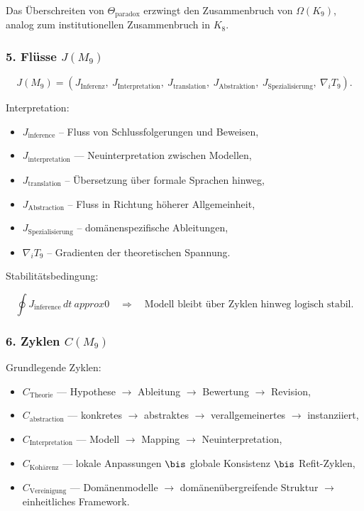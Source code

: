 Das Überschreiten von $\Theta_{\mathrm{paradox}}$ erzwingt den Zusammenbruch von $\Omega(K_9)$,
analog zum institutionellen Zusammenbruch in $K_8$.

\subsubsection*{5. Flüsse \texorpdfstring{$J(M_9)$}{J(M_9)}}

\[
J(M_9)=
(J_{\mathrm{Inferenz}},\
J_{\mathrm{Interpretation}},\
J_{\mathrm{translation}},\
J_{\mathrm{Abstraktion}},\
J_{\mathrm{Spezialisierung}},\
\nabla_i T_9).
\]

Interpretation:

\begin{itemize}
    \item $J_{\mathrm{inference}}$ – Fluss von Schlussfolgerungen und Beweisen,
    \item $J_{\mathrm{interpretation}}$ — Neuinterpretation zwischen Modellen,
    \item $J_{\mathrm{translation}}$ – Übersetzung über formale Sprachen hinweg,
    \item $J_{\mathrm{Abstraction}}$ – Fluss in Richtung höherer Allgemeinheit,
    \item $J_{\mathrm{Spezialisierung}}$ – domänenspezifische Ableitungen,
    \item $\nabla_i T_9$ – Gradienten der theoretischen Spannung.
\end{itemize}

Stabilitätsbedingung:

\[
\oint J_{\mathrm{inference}}\,dt\ approx 0
\quad\Rightarrow\quad
\text{Modell bleibt über Zyklen hinweg logisch stabil}.
\]

\subsubsection*{6. Zyklen \texorpdfstring{$C(M_9)$}{C(M_9)}}

Grundlegende Zyklen:

\begin{itemize}
    \item $C_{\mathrm{Theorie}}$
        — Hypothese $\to$ Ableitung $\to$ Bewertung $\to$ Revision,
    \item $C_{\mathrm{abstraction}}$
        — konkretes $\to$ abstraktes $\to$ verallgemeinertes $\to$ instanziiert,
    \item $C_{\mathrm{Interpretation}}$
        — Modell $\to$ Mapping $\to$ Neuinterpretation,
    \item $C_{\mathrm{Kohärenz}}$
        — lokale Anpassungen $\bis$ globale Konsistenz $\bis$ Refit-Zyklen,
    \item $C_{\mathrm{Vereinigung}}$
        — Domänenmodelle $\to$ domänenübergreifende Struktur $\to$ einheitliches Framework.
\end{itemize}

